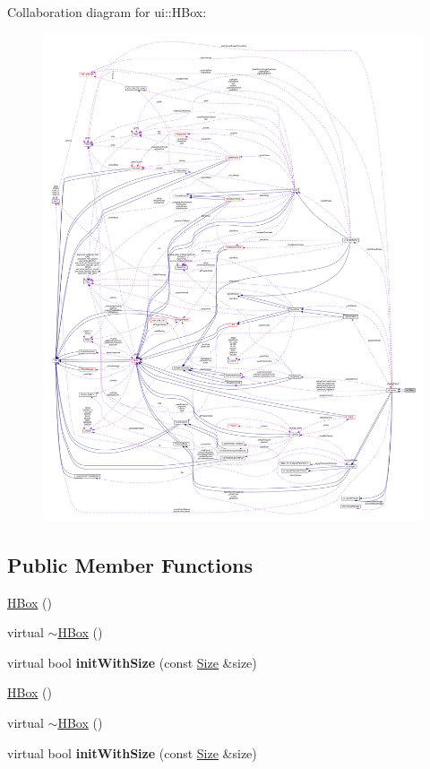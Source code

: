 Collaboration diagram for ui\+:\+:H\+Box\+:
\nopagebreak
\begin{figure}[H]
\begin{center}
\leavevmode
\includegraphics[width=350pt]{classui_1_1HBox__coll__graph}
\end{center}
\end{figure}
\subsection*{Public Member Functions}
\begin{DoxyCompactItemize}
\item 
\hyperlink{classui_1_1HBox_a019d6f16534667d80294fd30306009c6}{H\+Box} ()
\item 
virtual \hyperlink{classui_1_1HBox_aee3cccf328de7ca6cb2e9841e7223cd9}{$\sim$\+H\+Box} ()
\item 
\mbox{\label{classui_1_1HBox_ad70743d4f82b6b05493effb71b01a332}} 
virtual bool {\bfseries init\+With\+Size} (const \hyperlink{classSize}{Size} \&size)
\item 
\hyperlink{classui_1_1HBox_a019d6f16534667d80294fd30306009c6}{H\+Box} ()
\item 
virtual \hyperlink{classui_1_1HBox_a71eed7fec1971098b2ea6ac76d25bbfa}{$\sim$\+H\+Box} ()
\item 
\mbox{\label{classui_1_1HBox_af4bf4d77b97c8cf7055c490b62fe3cb5}} 
virtual bool {\bfseries init\+With\+Size} (const \hyperlink{classSize}{Size} \&size)
\end{DoxyCompactItemize}
